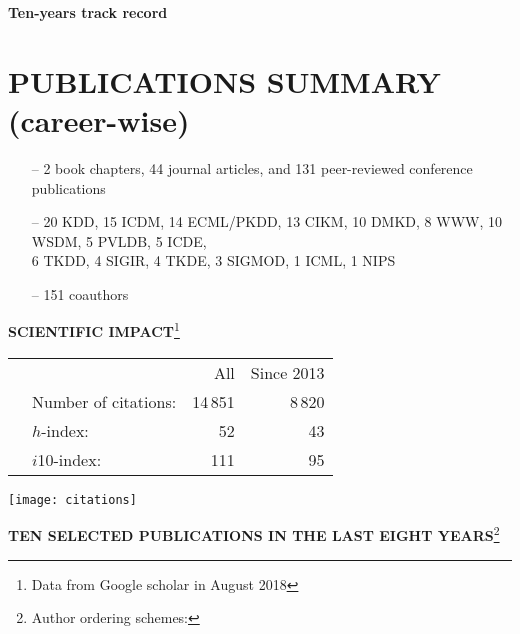 \documentclass[a4paper,11pt]{res}
\begin{document}
\begin{resume}

\vspace{-1.2cm}
\begin{center}
{\large\bf  Ten-years track record}
\end{center}

\section{{\small PUBLICATIONS SUMMARY} (career-wise)}
\begin{itemize}
\item[--] 2 book chapters, 44 journal articles, and 131 peer-reviewed conference publications
\item[--] 20 KDD, 15 ICDM, 14 ECML/PKDD, 13 CIKM, 10 DMKD, 8 WWW, 10 WSDM, 5 PVLDB, 5 ICDE,\\ 
6 TKDD, 4 SIGIR, 4 TKDE, 3 SIGMOD, 1 ICML, 1 NIPS
\item[--] 151 coauthors
\end{itemize}


\smallskip
{{\small\bf SCIENTIFIC IMPACT}}\footnote{Data from Google scholar in August 2018} \\
\begin{minipage}{0.5\textwidth}
\begin{center}
\begin{tabular}{llrr}
&  & All & Since 2013 \\
& Number of citations: & 14\,851 & 8\,820 \\
& $h$-index: & 52 & 43 \\
& $i$10-index: & 111 & 95 \\
\end{tabular} 
\end{center}
\end{minipage}
\begin{minipage}{0.5\textwidth}
\begin{center}
\texttt{[image: citations]}
\end{center}
\end{minipage}

\medskip
{{\bf\small TEN SELECTED PUBLICATIONS IN THE LAST EIGHT YEARS}}\footnote{\noindent Author ordering schemes:

}
\end{resume}
\end{document}
